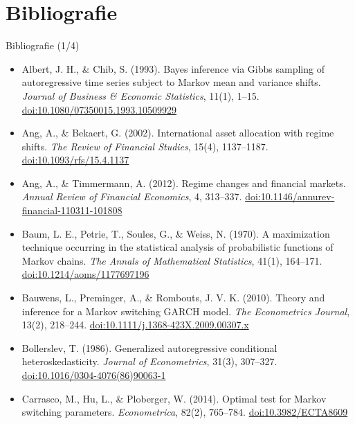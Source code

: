 \section{Bibliografie}

\begin{frame}{Bibliografie (1/4)}
\itemsize{\tiny}
\begin{itemize}
    \item Albert, J. H., \& Chib, S. (1993). Bayes inference via Gibbs sampling of autoregressive time series subject to Markov mean and variance shifts. \textit{Journal of Business \& Economic Statistics}, 11(1), 1--15. \href{https://doi.org/10.1080/07350015.1993.10509929}{doi:10.1080/07350015.1993.10509929}
    \item Ang, A., \& Bekaert, G. (2002). International asset allocation with regime shifts. \textit{The Review of Financial Studies}, 15(4), 1137--1187. \href{https://doi.org/10.1093/rfs/15.4.1137}{doi:10.1093/rfs/15.4.1137}
    \item Ang, A., \& Timmermann, A. (2012). Regime changes and financial markets. \textit{Annual Review of Financial Economics}, 4, 313--337. \href{https://doi.org/10.1146/annurev-financial-110311-101808}{doi:10.1146/annurev-financial-110311-101808}
    \item Baum, L. E., Petrie, T., Soules, G., \& Weiss, N. (1970). A maximization technique occurring in the statistical analysis of probabilistic functions of Markov chains. \textit{The Annals of Mathematical Statistics}, 41(1), 164--171. \href{https://doi.org/10.1214/aoms/1177697196}{doi:10.1214/aoms/1177697196}
    \item Bauwens, L., Preminger, A., \& Rombouts, J. V. K. (2010). Theory and inference for a Markov switching GARCH model. \textit{The Econometrics Journal}, 13(2), 218--244. \href{https://doi.org/10.1111/j.1368-423X.2009.00307.x}{doi:10.1111/j.1368-423X.2009.00307.x}
    \item Bollerslev, T. (1986). Generalized autoregressive conditional heteroskedasticity. \textit{Journal of Econometrics}, 31(3), 307--327. \href{https://doi.org/10.1016/0304-4076(86)90063-1}{doi:10.1016/0304-4076(86)90063-1}
    \item Carrasco, M., Hu, L., \& Ploberger, W. (2014). Optimal test for Markov switching parameters. \textit{Econometrica}, 82(2), 765--784. \href{https://doi.org/10.3982/ECTA8609}{doi:10.3982/ECTA8609}

\end{itemize}
\end{frame}
